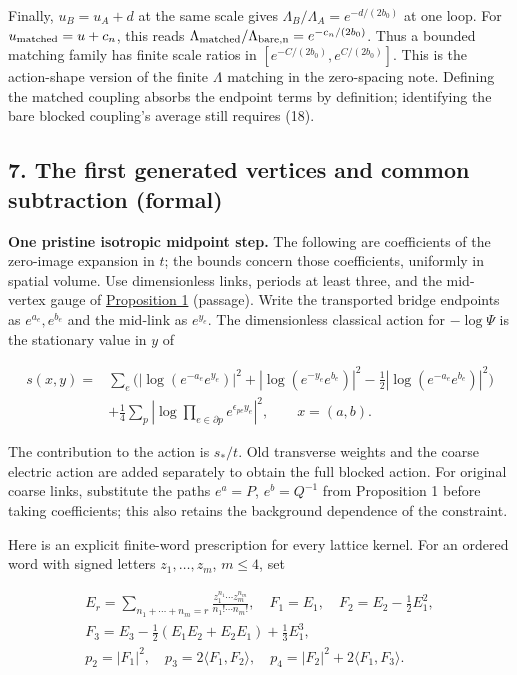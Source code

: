 \documentclass[11pt,a4paper]{article}
\begin{document}
Finally, \(u_B=u_A+d\) at the same scale gives
\(\Lambda_B/\Lambda_A=e^{-d/(2b_0)}\) at one loop. For
\(u_{\rm matched}=u+c_n\), this reads
\(\Lambda_{\rm matched}/\Lambda_{\rm bare,n}=e^{-c_n/(2b_0)}\). Thus a
bounded matching family has finite scale ratios in
\([e^{-C/(2b_0)},e^{C/(2b_0)}]\). This is the action-shape version of
the finite \(\Lambda\) matching in the zero-spacing note. Defining the
matched coupling absorbs the endpoint terms by definition; identifying
the bare blocked coupling's average still requires (18).

\hypertarget{the-first-generated-vertices-and-common-subtraction-formal}{%
\subsection{7. The first generated vertices and common subtraction
(formal)}\label{the-first-generated-vertices-and-common-subtraction-formal}}

\textbf{One pristine isotropic midpoint step.} The following are
coefficients of the zero-image expansion in \(t\); the bounds concern
those coefficients, uniformly in spatial volume. Use dimensionless
links, periods at least three, and the mid-vertex gauge of
\href{series-parallel-gauge-refinement.md}{Proposition 1} (passage).
Write the transported bridge endpoints as \(e^{a_e},e^{b_e}\) and the
mid-link as \(e^{y_e}\). The dimensionless classical action for
\(-\log\Psi\) is the stationary value in \(y\) of

\[\begin{aligned}
s(x,y)={}&\sum_e\bigl(|\log(e^{-a_e}e^{y_e})|^2+
 |\log(e^{-y_e}e^{b_e})|^2-\tfrac12|\log(e^{-a_e}e^{b_e})|^2\bigr)\\
 &+\tfrac14\sum_p|\log\prod_{e\in\partial p}e^{\epsilon_{pe}y_e}|^2,
 \qquad x=(a,b).
\end{aligned}\tag{21}\]

The contribution to the action is \(s_*/t\). Old transverse weights and
the coarse electric action are added separately to obtain the full
blocked action. For original coarse links, substitute the paths
\(e^a=P\), \(e^b=Q^{-1}\) from Proposition 1 before taking coefficients;
this also retains the background dependence of the constraint.

Here is an explicit finite-word prescription for every lattice kernel.
For an ordered word with signed letters \(z_1,\ldots,z_m\), \(m\le4\),
set

\[\begin{gathered}
 E_r=\sum_{n_1+\cdots+n_m=r}\frac{z_1^{n_1}\cdots z_m^{n_m}}{n_1!\cdots n_m!},\quad
 F_1=E_1,\quad F_2=E_2-\tfrac12E_1^2,\\
 F_3=E_3-\tfrac12(E_1E_2+E_2E_1)+\tfrac13E_1^3,\\
 p_2=|F_1|^2,\quad p_3=2\langle F_1,F_2\rangle,\quad
 p_4=|F_2|^2+2\langle F_1,F_3\rangle. \tag{22}
\end{gathered}\]
\end{document}
